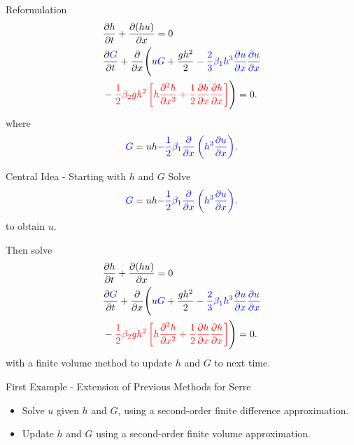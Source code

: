\documentclass[pdf]{beamer}
\begin{document}
\begin{frame}{Reformulation}
\begin{align*}
&\dfrac{\partial h}{\partial t} + \dfrac{\partial (hu)}{\partial x} = 0\\
&\dfrac{\partial {\color{blue} G} }{\partial t}  + \dfrac{\partial}{\partial x} \Bigg( u{\color{blue} G} + \dfrac{gh^2}{2} - {\color{blue} \frac{2}{3} \beta_1 h^3\dfrac{\partial u}{\partial x}\dfrac{\partial u}{\partial x} } \\ &- {\color{red}\frac{1}{2} \beta_2 g h^2  \left[h\frac{\partial^2 h}{\partial x^2} +   \frac{1}{2}\frac{\partial h}{\partial x}\frac{\partial h}{\partial x}\right] } \Bigg) = 0.
\end{align*}
where
\begin{gather*}
{\color{blue} G} = uh {\color{blue} - \frac{1}{2} \beta_1\dfrac{\partial }{\partial x} \left ( h^3 \dfrac{\partial u}{\partial x} \right )}.
\end{gather*}
\end{frame}


\begin{frame}{Central Idea - Starting with $h$ and $G$}
Solve
\begin{gather*}
{\color{blue} G} = uh {\color{blue} - \frac{1}{2} \beta_1\dfrac{\partial }{\partial x} \left ( h^3 \dfrac{\partial u}{\partial x} \right )}.
\end{gather*}
to obtain $u$.

\bigskip
\pause
Then solve
\begin{align*}
&\dfrac{\partial h}{\partial t} + \dfrac{\partial (hu)}{\partial x} = 0\\
&\dfrac{\partial {\color{blue} G} }{\partial t}  + \dfrac{\partial}{\partial x} \Bigg( u{\color{blue} G} + \dfrac{gh^2}{2} - {\color{blue} \frac{2}{3} \beta_1 h^3\dfrac{\partial u}{\partial x}\dfrac{\partial u}{\partial x} } \\ &- {\color{red}\frac{1}{2} \beta_2 g h^2  \left[h\frac{\partial^2 h}{\partial x^2} +   \frac{1}{2}\frac{\partial h}{\partial x}\frac{\partial h}{\partial x}\right] } \Bigg) = 0.
\end{align*}
with a finite volume method to update $h$ and $G$ to next time. 
\end{frame}

\begin{frame}{First Example - Extension of Previous Methods for Serre}
\begin{itemize}
	\item Solve $u$ given $h$ and $G$, using a second-order finite difference approximation.
	\item Update $h$ and $G$ using a second-order finite volume approximation.
\end{itemize}
\end{frame}
\end{document}
